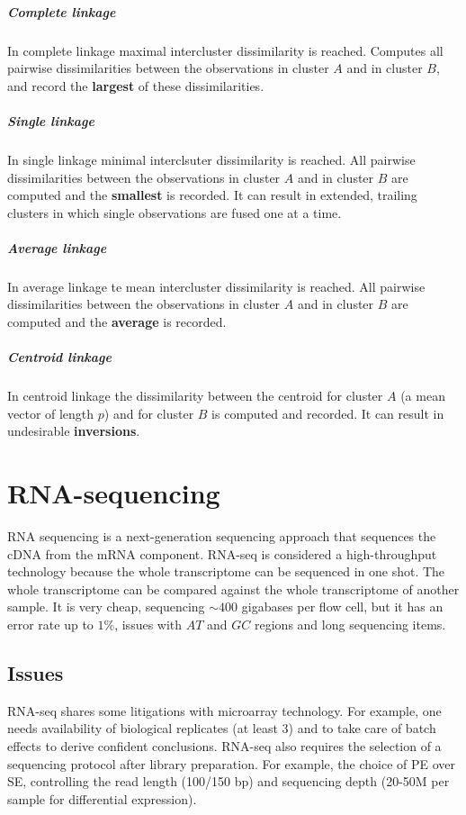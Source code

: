 				\subparagraph{Complete linkage}
				In complete linkage maximal intercluster dissimilarity is reached.
				Computes all pairwise dissimilarities between the observations in cluster $A$ and in cluster $B$, and record the \textbf{largest} of these dissimilarities.

				\subparagraph{Single linkage}
				In single linkage minimal interclsuter dissimilarity is reached.
				All pairwise dissimilarities between the observations in cluster $A$ and in cluster $B$ are computed and the \textbf{smallest} is recorded.
				It can result in extended, trailing clusters in which single observations are fused one at a time.

				\subparagraph{Average linkage}
				In average linkage te mean intercluster dissimilarity  is reached.
				All pairwise dissimilarities between the observations in cluster $A$ and in cluster $B$ are computed and the \textbf{average} is recorded.

				\subparagraph{Centroid linkage}
				In centroid linkage the dissimilarity between the centroid for cluster $A$ (a mean vector of length $p$) and for cluster $B$ is computed and recorded.
				It can result in undesirable \textbf{inversions}.


\section{RNA-sequencing}
	RNA sequencing is a next-generation sequencing approach that sequences the cDNA from the mRNA component.
	RNA-seq is considered a high-throughput technology because the whole transcriptome can be sequenced in one shot.
	The whole transcriptome can be compared against the whole transcriptome of another sample.
	It is very cheap, sequencing $\sim 400$ gigabases per flow cell, but it has an error rate up to $1\%$, issues with $AT$ and $GC$ regions and long sequencing items.

	\subsection{Issues}
	RNA-seq shares some litigations with microarray technology.
	For example, one needs availability of biological replicates (at least $3$) and to take care of batch effects to derive confident conclusions.
	RNA-seq also requires the selection of a sequencing protocol after library preparation.
	For example, the choice of PE over SE, controlling the read length (100/150 bp) and sequencing depth (20-50M per sample for differential expression).

